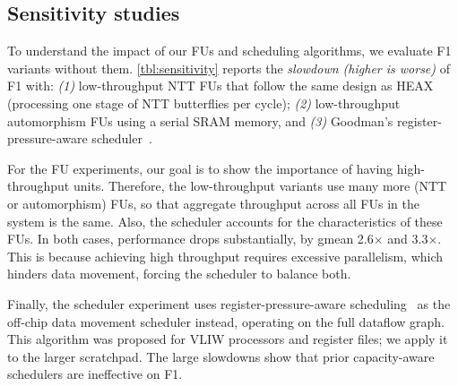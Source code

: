 
\subsection{Sensitivity studies}
\label{sec:sensitivity}

\tblSensitivity

To understand the impact of our FUs and scheduling algorithms, we evaluate F1 variants without them.
\autoref{tbl:sensitivity} reports the \emph{slowdown (higher is worse)} of F1 with:
\emph{(1)} low\hyp{}throughput NTT FUs that follow the same design as HEAX
(processing one stage of NTT butterflies per cycle); %
\emph{(2)} low\hyp{}throughput automorphism FUs using a serial SRAM memory,
and \emph{(3)} Goodman's register-pressure-aware scheduler~\cite{goodman:ics1988:code}.

For the FU experiments, our goal is to show the importance of having high-throughput units.
Therefore, the low-throughput variants use many more (NTT or automorphism) FUs,
so that aggregate throughput across all FUs in the system is the same.
Also, the scheduler accounts for the characteristics of these FUs.
In both cases, performance drops substantially, by gmean 2.6$\times$ and 3.3$\times$.
This is because achieving high throughput requires excessive parallelism,
which hinders data movement, forcing the scheduler to balance both.



Finally, the scheduler experiment uses register-pressure-aware scheduling~\cite{goodman:ics1988:code}
as the off-chip data movement scheduler instead, operating on the full dataflow graph.
This algorithm was proposed for VLIW processors and register files; we apply it to the larger scratchpad.
The large slowdowns show that prior capacity-aware schedulers are ineffective on F1.


